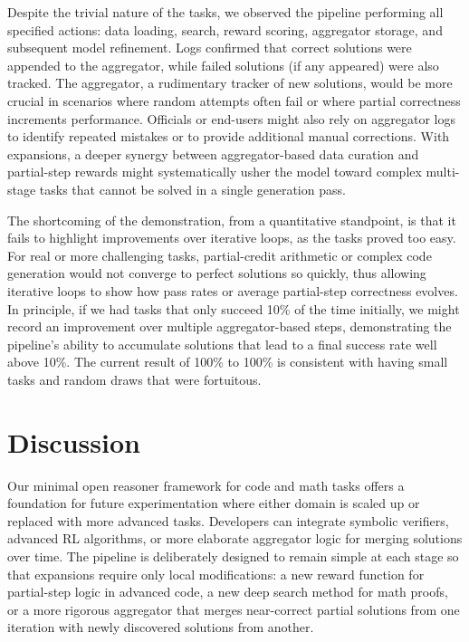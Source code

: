 \documentclass{article}
\begin{document}
Despite the trivial nature of the tasks, we observed the pipeline performing all specified actions: data loading, search, reward scoring, aggregator storage, and subsequent model refinement. Logs confirmed that correct solutions were appended to the aggregator, while failed solutions (if any appeared) were also tracked. The aggregator, a rudimentary tracker of new solutions, would be more crucial in scenarios where random attempts often fail or where partial correctness increments performance. Officials or end-users might also rely on aggregator logs to identify repeated mistakes or to provide additional manual corrections. With expansions, a deeper synergy between aggregator-based data curation and partial-step rewards might systematically usher the model toward complex multi-stage tasks that cannot be solved in a single generation pass.

The shortcoming of the demonstration, from a quantitative standpoint, is that it fails to highlight improvements over iterative loops, as the tasks proved too easy. For real or more challenging tasks, partial-credit arithmetic or complex code generation would not converge to perfect solutions so quickly, thus allowing iterative loops to show how pass rates or average partial-step correctness evolves. In principle, if we had tasks that only succeed 10\% of the time initially, we might record an improvement over multiple aggregator-based steps, demonstrating the pipeline’s ability to accumulate solutions that lead to a final success rate well above 10\%. The current result of 100\% to 100\% is consistent with having small tasks and random draws that were fortuitous.

\section{Discussion}
Our minimal open reasoner framework for code and math tasks offers a foundation for future experimentation where either domain is scaled up or replaced with more advanced tasks. Developers can integrate symbolic verifiers, advanced RL algorithms, or more elaborate aggregator logic for merging solutions over time. The pipeline is deliberately designed to remain simple at each stage so that expansions require only local modifications: a new reward function for partial-step logic in advanced code, a new deep search method for math proofs, or a more rigorous aggregator that merges near-correct partial solutions from one iteration with newly discovered solutions from another.
\end{document}
